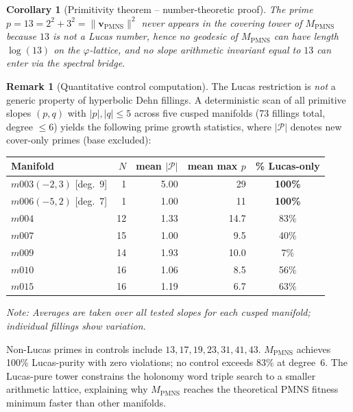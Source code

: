 \documentclass[12pt]{article}
\newtheorem{corollary}[theorem]{Corollary}
\theoremstyle{definition}
\newtheorem{remark}[theorem]{Remark}
\newcommand{\ph}{\varphi}
\begin{document}
\begin{corollary}[Primitivity theorem -- number-theoretic proof]
\label{cor:primitivity}
The prime $p = 13 = 2^2 + 3^2 = \|\mathbf{v}_{\mathrm{PMNS}}\|^2$
never appears in the covering tower of $M_{\mathrm{PMNS}}$ because
$13$ is not a Lucas number, hence no geodesic of $M_{\mathrm{PMNS}}$
can have length $\log(13)$ on the $\ph$-lattice, and no slope
arithmetic invariant equal to $13$ can enter via the spectral bridge.
\end{corollary}


\begin{remark}[Quantitative control computation]
The Lucas restriction is \emph{not} a generic property of hyperbolic
Dehn fillings. A deterministic scan of all primitive slopes $(p,q)$
with $|p|,|q| \leq 5$ across five cusped manifolds (73 fillings total,
degree $\leq 6$) yields the following prime growth statistics,
where $|\mathcal{P}|$ denotes new cover-only primes (base excluded):

\begin{center}
\begin{tabular}{lrrrc}
\toprule
Manifold & $N$ & mean $|\mathcal{P}|$ & mean max $p$ & \% Lucas-only \\
\midrule
$m003(-2,3)$ [deg.~9] & 1 & 5.00 & 29 & \textbf{100\%} \\
$m006(-5,2)$ [deg.~7] & 1 & 1.00 & 11 & \textbf{100\%} \\
$m004$                & 12 & 1.33 & 14.7 & 83\% \\
$m007$                & 15 & 1.00 &  9.5 & 40\% \\
$m009$                & 14 & 1.93 & 10.0 &  7\% \\
$m010$                & 16 & 1.06 &  8.5 & 56\% \\
$m015$                & 16 & 1.19 &  6.7 & 63\% \\
\bottomrule
\end{tabular}
\end{center}

\noindent\textit{Note: Averages are taken over all tested slopes
for each cusped manifold; individual fillings show variation.}

\noindent
Non-Lucas primes in controls include $13, 17, 19, 23, 31, 41, 43$.
$M_{\mathrm{PMNS}}$ achieves 100\% Lucas-purity with zero violations;
no control exceeds 83\% at degree~6.
The Lucas-pure tower constrains the holonomy word triple search to a
smaller arithmetic lattice, explaining why $M_{\mathrm{PMNS}}$ reaches
the theoretical PMNS fitness minimum faster than other manifolds.
\end{remark}
\end{document}
